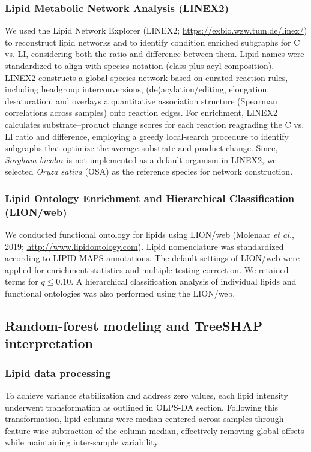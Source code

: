 \documentclass[10pt,letterpaper]{article}
\begin{document}
\begin{itemize}
\subsubsection*{Lipid Metabolic Network Analysis (LINEX2)}

We used the Lipid Network Explorer (LINEX2; \url{https://exbio.wzw.tum.de/linex/}) to reconstruct lipid networks and to identify condition enriched subgraphs for C vs. LI, considering both the ratio and difference between them. Lipid names were standardized to align with species notation (class plus acyl composition). LINEX2 constructs a global species network based on curated reaction rules, including headgroup interconversions, (de)acylation/editing, elongation, desaturation, and overlays a quantitative association structure (Spearman correlations across samples) onto reaction edges. For enrichment, LINEX2 calculates substrate–product change scores for each reaction reagrading the C vs. LI ratio and difference, employing a greedy local-search procedure to identify subgraphs that optimize the average substrate and product change. Since, \textit{Sorghum bicolor} is not implemented as a default organism in LINEX2, we selected \textit{Oryza sativa} (OSA) as the reference species for network construction.


\subsubsection*{Lipid Ontology Enrichment and Hierarchical Classification (LION/web)}
We conducted functional ontology for lipids using LION/web (Molenaar \emph{et al.}, 2019; \url{http://www.lipidontology.com}). Lipid nomenclature was standardized according to LIPID MAPS annotations. The default settings of LION/web were applied for enrichment statistics and multiple-testing correction. We retained terms for $q \leq 0.10$. A hierarchical classification analysis of individual lipids and functional ontologies was also performed using the LION/web.


\subsection*{Random-forest modeling and TreeSHAP interpretation}
\subsubsection*{Lipid data processing}
To achieve variance stabilization and address zero values, each lipid intensity underwent transformation as outlined in OLPS-DA section. Following this transformation, lipid columns were median-centered across samples through feature-wise subtraction of the column median, effectively removing global offsets while maintaining inter-sample variability.


\end{itemize}
\end{document}
